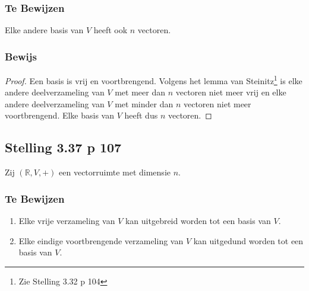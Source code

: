 \documentclass[lineaire_algebra_oplossingen.tex]{subfiles}
\begin{document}
\subsubsection*{Te Bewijzen}
Elke andere basis van $V$ heeft ook $n$ vectoren.

\subsubsection*{Bewijs}
\begin{proof}
Een basis is vrij en voortbrengend.
Volgens het lemma van Steinitz\footnote{Zie Stelling 3.32 p 104} is elke andere deelverzameling van $V$ met meer dan $n$ vectoren niet meer vrij en elke andere deelverzameling van $V$ met minder dan $n$ vectoren niet meer voortbrengend. Elke basis van $V$ heeft dus $n$ vectoren.
\end{proof}


\subsection{Stelling 3.37 p 107}
\label{3.37}
Zij $(\mathbb{R},V,+)$ een vectorruimte met dimensie $n$.

\subsubsection*{Te Bewijzen}
\begin{enumerate}
\item Elke vrije verzameling van $V$ kan uitgebreid worden tot een basis van $V$.
\item Elke eindige voortbrengende verzameling van $V$ kan uitgedund worden tot een basis van $V$.
\end{enumerate}
\end{document}

